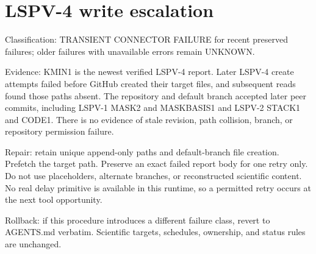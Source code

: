\documentclass{article}
\begin{document}
\section*{LSPV-4 write escalation}
Classification: TRANSIENT CONNECTOR FAILURE for recent preserved failures; older failures with unavailable errors remain UNKNOWN.

Evidence: KMIN1 is the newest verified LSPV-4 report. Later LSPV-4 create attempts failed before GitHub created their target files, and subsequent reads found those paths absent. The repository and default branch accepted later peer commits, including LSPV-1 MASK2 and MASKBASIS1 and LSPV-2 STACK1 and CODE1. There is no evidence of stale revision, path collision, branch, or repository permission failure.

Repair: retain unique append-only paths and default-branch file creation. Prefetch the target path. Preserve an exact failed report body for one retry only. Do not use placeholders, alternate branches, or reconstructed scientific content. No real delay primitive is available in this runtime, so a permitted retry occurs at the next tool opportunity.

Rollback: if this procedure introduces a different failure class, revert to AGENTS.md verbatim. Scientific targets, schedules, ownership, and status rules are unchanged.
\end{document}
